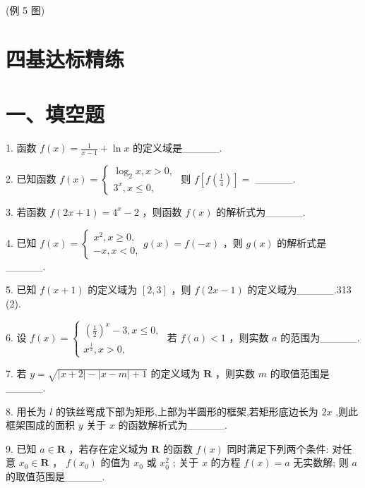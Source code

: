(例 5 图)

\section*{四基达标精练}

\section*{一、填空题}

1. 函数 $f\left( x\right)  = \frac{1}{x - 1} + \ln x$ 的定义域是\_\_\_\_\_.

2. 已知函数 $f\left( x\right)  = \left\{  \begin{array}{l} {\log }_{2}x,x > 0, \\  {3}^{x},x \leq  0, \end{array}\right.$ 则 $f\left\lbrack  {f\left( \frac{1}{4}\right) }\right\rbrack   =$ \_\_\_\_\_.

3. 若函数 $f\left( {{2x} + 1}\right)  = {4}^{x} - 2$ ，则函数 $f\left( x\right)$ 的解析式为\_\_\_\_\_.

4. 已知 $f\left( x\right)  = \left\{  {\begin{array}{l} {x}^{2},x \geq  0, \\   - x,x < 0, \end{array}g\left( x\right)  = f\left( {-x}\right) }\right.$ ，则 $g\left( x\right)$ 的解析式是\_\_\_\_\_.

5. 已知 $f\left( {x + 1}\right)$ 的定义域为 $\left\lbrack  {2,3}\right\rbrack$ ，则 $f\left( {{2x} - 1}\right)$ 的定义域为\_\_\_\_\_.313 (2).

6. 设 $f\left( x\right)  = \left\{  \begin{array}{l} {\left( \frac{1}{2}\right) }^{x} - 3,x \leq  0, \\  {x}^{\frac{1}{2}},x > 0, \end{array}\right.$ 若 $f\left( a\right)  < 1$ ，则实数 $a$ 的范围为\_\_\_\_\_.

7. 若 $y = \sqrt{\left| {x + 2}\right|  - \left| {x - m}\right|  + 1}$ 的定义域为 $\mathbf{R}$ ，则实数 $m$ 的取值范围是\_\_\_\_\_.

8. 用长为 $l$ 的铁丝弯成下部为矩形,上部为半圆形的框架,若矩形底边长为 ${2x}$ ,则此框架围成的面积 $y$ 关于 $x$ 的函数解析式为\_\_\_\_\_.

9. 已知 $a \in  \mathbf{R}$ ，若存在定义域为 $\mathbf{R}$ 的函数 $f\left( x\right)$ 同时满足下列两个条件:  对任意 ${x}_{0} \in  \mathbf{R}$ ， $f\left( {x}_{0}\right)$ 的值为 ${x}_{0}$ 或 ${x}_{0}^{2}$ ;   关于 $x$ 的方程 $f\left( x\right)  = a$ 无实数解; 则 $a$ 的取值范围是\_\_\_\_\_.

